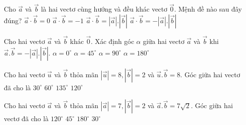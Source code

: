 \begin{ex} %
	Cho $\vec{a}$ và $\vec{b}$ là hai vectơ cùng hướng và đều khác vectơ $\vec{0}$. Mệnh đề nào sau đây đúng?
	\choice
	{$\vec{a}\cdot\vec{b}=0$}
	{$\vec{a}\cdot\vec{b}=-1$}
	{\True $\vec{a}\cdot\vec{b}=\left|{\vec{a}}\right|.\left|{\vec{b}}\right|$}
	{$\vec{a}\cdot\vec{b}=-\left|{\vec{a}}\right|.\left|{\vec{b}}\right|$}
\end{ex}
\begin{ex} %
	Cho hai vectơ $\vec{a}$ và $\vec{b}$ khác $\vec{0}$. Xác định góc $\alpha $ giữa hai vectơ $\vec{a}$ và $\vec{b}$ khi $\vec{a}.\vec{b}=-\left|{\vec{a}}\right|.\left|{\vec{b}}\right| $.
	\choice
	{$\alpha =0^\circ$}
	{$\alpha =45^\circ$}
	{$\alpha =90^\circ$}
	{\True $\alpha =180^\circ$}
\end{ex}
\begin{ex}
	Cho hai vectơ $\overrightarrow{u}$ và $\overrightarrow{b}$ thỏa mãn $|\overrightarrow{u}|=8,|\overrightarrow{b}|=2$ và $\overrightarrow{u}.\overrightarrow{b}=8$. Góc giữa hai vectơ đã cho là
	\choice
	{ $30^\circ$ }
	{ \True $60^\circ$ }
	{ $135^\circ$ }
	{ $120^\circ$ }
	\end{ex}
\begin{ex}
	Cho hai vectơ $\overrightarrow{a}$ và $\overrightarrow{b}$ thỏa mãn $|\overrightarrow{a}|=7,|\overrightarrow{b}|=2$ và $\overrightarrow{a}.\overrightarrow{b}=7 \sqrt{2}$. Góc giữa hai vectơ đã cho là
	\choice
	{ $120^\circ$ }
	{ \True $45^\circ$ }
	{ $180^\circ$ }
	{ $30^\circ$ }
	\end{ex}
